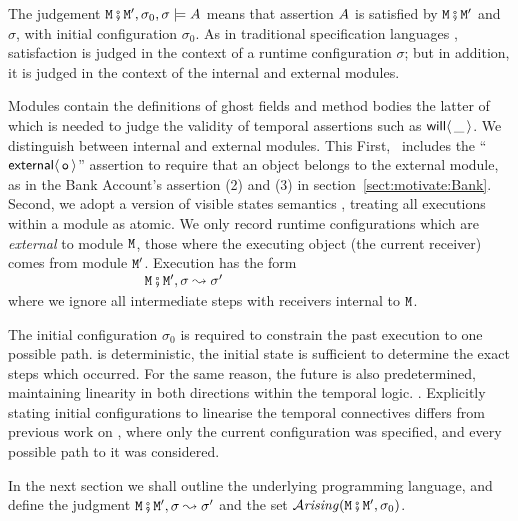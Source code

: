 The judgement ${\mbox{\tt{\ensuremath{{\mbox{\tt{M}}}}}}} \fatsemi  {{\mbox{\tt{\ensuremath{{\mbox{\tt{M}}}}}}}'},\sigma_0 , \sigma \models A$ means that  
assertion $A$ is satisfied by  ${\mbox{\tt{\ensuremath{{\mbox{\tt{M}}}}}}} \fatsemi  {{\mbox{\tt{\ensuremath{{\mbox{\tt{M}}}}}}}'}$ and $\sigma$, with initial configuration $\sigma_0$.  
As in traditional specification languages \cite{Leavens-etal07,Meyer92}, satisfaction is judged 
in the context of a runtime configuration $\sigma$; but in addition, it is judged in the context of the internal and external modules.


Modules contain the definitions of ghost fields and method bodies the latter of which is needed to judge the validity of temporal assertions such as ${\mathsf{will}}\langle \,\_\,\rangle$. We distinguish between internal and external modules. This %
First, 
\Chainmail\ includes the ``${\mathsf{external}}\langle\, {\mbox{\tt{o}}}\, \rangle$'' assertion to require
that an object belongs to the external module, as in the Bank
Account's assertion (2) and (3) in
section~\ref{sect:motivate:Bank}. Second, we adopt a version of
visible states semantics \cite{MuellerPoetzsch-HeffterLeavens06,larch93,Meyer97}, treating all
executions within a module as atomic.
We only record runtime configurations which are {\em external}
 to module ${\mbox{\tt{\ensuremath{{\mbox{\tt{M}}}}}}}$, \ie those where the
 executing object (\ie the current receiver) comes from module ${\mbox{\tt{\ensuremath{{\mbox{\tt{M}}}}}}}'$.
 Execution %
 has the form\\
 $~ \strut  \hspace{1.3in}    {\mbox{\tt{\ensuremath{{\mbox{\tt{M}}}}}}} \fatsemi  {{\mbox{\tt{\ensuremath{{\mbox{\tt{M}}}}}}}'},\sigma \leadsto \sigma'$\\  
where we ignore all intermediate steps
 with receivers  internal to ${\mbox{\tt{\ensuremath{{\mbox{\tt{M}}}}}}}$. 
%

The initial configuration $\sigma_0$ is required to constrain the past execution to one possible path. 
is deterministic, the initial state is sufficient to determine the exact steps which occurred. For the same reason, the future is also predetermined, maintaining linearity in both directions within the temporal logic. 
. Explicitly stating initial configurations to linearise the temporal connectives differs from previous work on \Chainmail\cite{FASE}, where only the current configuration was specified, and every possible path to it was considered.

In the next section we  shall 
outline the underlying programming language, and
define the judgment  ${\mbox{\tt{\ensuremath{{\mbox{\tt{M}}}}}}} \fatsemi  {{\mbox{\tt{\ensuremath{{\mbox{\tt{M}}}}}}}'},\sigma \leadsto \sigma'$ and the set 
${\mathcal{A}}\textrm{\textit{rising}}({\mbox{\tt{\ensuremath{{\mbox{\tt{M}}}}}}} \fatsemi  {{\mbox{\tt{\ensuremath{{\mbox{\tt{M}}}}}}}'}, \sigma_0)$.
 



